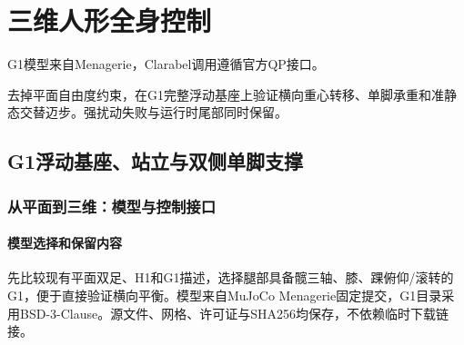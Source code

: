 \chapter{三维人形全身控制}
G1模型来自Menagerie\cite{menagerie}，Clarabel调用遵循官方QP接口\cite{clarabel}。


去掉平面自由度约束，在G1完整浮动基座上验证横向重心转移、单脚承重和准静态交替迈步。强扰动失败与运行时尾部同时保留。

\section{G1浮动基座、站立与双侧单脚支撑}

\label{stage:s25}

\subsection{从平面到三维：模型与控制接口}\label{s25-detail-1}

\subsubsection{模型选择和保留内容}\label{s25-detail-2}

先比较现有平面双足、H1和G1描述，选择腿部具备髋三轴、膝、踝俯仰/滚转的G1，便于直接验证横向平衡。模型来自MuJoCo Menagerie固定提交，G1目录采用BSD-3-Clause。源文件、网格、许可证与SHA256均保存，不依赖临时下载链接。

